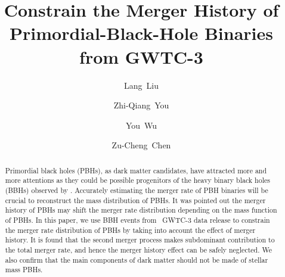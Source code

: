\documentclass[twocolumn]{aastex631}
\begin{document}
	
\title{Constrain the Merger History of Primordial-Black-Hole Binaries from GWTC-3}
	
\author[0000-0002-0297-9633]{Lang~Liu}


\author[0000-0002-3309-415X]{Zhi-Qiang~You}

\author[0000-0002-9610-2284]{You~Wu}

\author[0000-0001-7016-9934]{Zu-Cheng~Chen}

	
\begin{abstract}
Primordial black holes (PBHs), as dark matter candidates, have attracted 
more and more attentions as they could be possible progenitors of 
the heavy binary black holes (BBHs) observed by \lvc.
Accurately estimating the merger rate of PBH binaries will be crucial to
reconstruct the mass distribution of PBHs.
It was pointed out the merger history of PBHs may shift the merger rate distribution depending on the mass function of PBHs.
In this paper, we use BBH events from \lvc\ GWTC-3 data release to
constrain the merger rate distribution of PBHs by taking into account the effect of merger history.
It is found that the second merger process makes subdominant contribution to the 
total merger rate, and hence the merger history effect can be safely neglected.	
We also confirm that the main components of dark matter should not be made of stellar 
mass PBHs.

\end{abstract}
	
\end{document}
